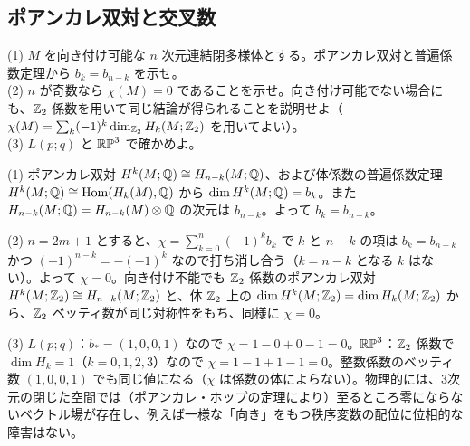 \subsection{ポアンカレ双対と交叉数}

\begin{problem}[難易度 A]\label{ch06-prob-odd}
(1) $M$ を向き付け可能な $n$ 次元連結閉多様体とする。ポアンカレ双対と普遍係数定理から $b_k=b_{n-k}$ を示せ。\\
(2) $n$ が奇数なら $\chi(M)=0$ であることを示せ。向き付け可能でない場合にも、$\mathbb{Z}_2$ 係数を用いて同じ結論が得られることを説明せよ（$\chi(M)=\sum_k(-1)^k\dim_{\mathbb{Z}_2}H_k(M;\mathbb{Z}_2)$ を用いてよい）。\\
(3) $L(p;q)$ と $\mathbb{RP}^3$ で確かめよ。
\end{problem}

\begin{solution}
(1) ポアンカレ双対 $H^k(M;\mathbb{Q})\cong H_{n-k}(M;\mathbb{Q})$、および体係数の普遍係数定理 $H^k(M;\mathbb{Q})\cong\operatorname{Hom}(H_k(M),\mathbb{Q})$ から $\dim H^k(M;\mathbb{Q})=b_k$。また $H_{n-k}(M;\mathbb{Q})=H_{n-k}(M)\otimes\mathbb{Q}$ の次元は $b_{n-k}$。よって $b_k=b_{n-k}$。

(2) $n=2m+1$ とすると、$\chi=\sum_{k=0}^n(-1)^kb_k$ で $k$ と $n-k$ の項は $b_k=b_{n-k}$ かつ $(-1)^{n-k}=-(-1)^k$ なので打ち消し合う（$k=n-k$ となる $k$ はない）。よって $\chi=0$。向き付け不能でも $\mathbb{Z}_2$ 係数のポアンカレ双対 $H^k(M;\mathbb{Z}_2)\cong H_{n-k}(M;\mathbb{Z}_2)$ と、体 $\mathbb{Z}_2$ 上の $\dim H^k(M;\mathbb{Z}_2)=\dim H_k(M;\mathbb{Z}_2)$ から、$\mathbb{Z}_2$ ベッティ数が同じ対称性をもち、同様に $\chi=0$。

(3) $L(p;q)$：$b_*=(1,0,0,1)$ なので $\chi=1-0+0-1=0$。$\mathbb{RP}^3$：$\mathbb{Z}_2$ 係数で $\dim H_k=1$（$k=0,1,2,3$）なので $\chi=1-1+1-1=0$。整数係数のベッティ数 $(1,0,0,1)$ でも同じ値になる（$\chi$ は係数の体によらない）。物理的には、3次元の閉じた空間では（ポアンカレ・ホップの定理により）至るところ零にならないベクトル場が存在し、例えば一様な「向き」をもつ秩序変数の配位に位相的な障害はない。
\end{solution}

